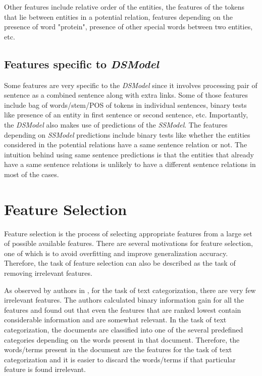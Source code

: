 Other features include relative order of the entities, the features of the tokens that lie between entities in a potential relation, features depending on the presence of word "protein", presence of other special words between two entities, etc.

\subsection*{Features specific to \textit{DSModel}}

Some features are very specific to the \textit{DSModel} since it involves processing pair of sentence as a combined sentence along with extra links. Some of those features include bag of words/stem/POS of tokens in individual sentences, binary tests like presence of an entity in first sentence or second sentence,  etc. Importantly, the \textit{DSModel} also makes use of predictions of the \textit{SSModel}. The features depending on \textit{SSModel} predictions include binary tests like whether the entities considered in the potential relations have a same sentence relation or not. The intuition behind using same sentence predictions is that the entities that already have a same sentence relations is unlikely to have a different sentence relations in most of the cases.

\section{Feature Selection}\label{sec:featSel}


Feature selection is the process of selecting appropriate features from a large set of possible available features. There are several motivations for feature selection, one of which is to avoid overfitting and improve generalization accuracy. Therefore, the task of feature selection can also be described as the task of removing irrelevant features.

%
%
%

As observed by authors in \cite{joachims1998text}, for the task of text categorization, there are very few irrelevant features. The authors calculated binary information gain for all the features and found out that even the features that are ranked lowest contain considerable information and are somewhat relevant. In the task of text categorization, the documents are classified into one of the several predefined categories depending on the words present in that document. Therefore, the words/terms present in the document are the features for the task of text categorization and it is easier to discard the words/terms if that particular feature is found irrelevant.


